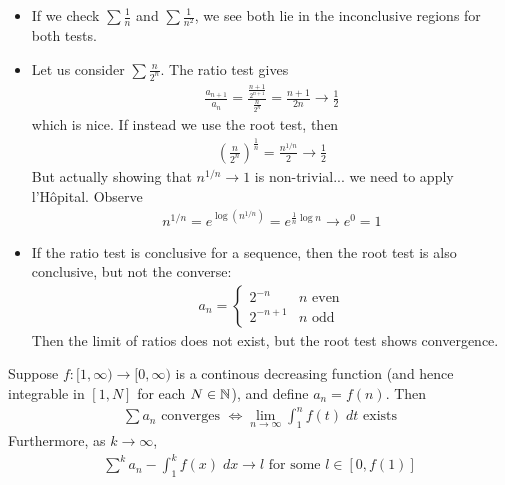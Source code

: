 \documentclass{../template/note}
\begin{document}
    \begin{example}
        \begin{itemize}
            \item If we check \(\sum \frac 1 n\) and \(\sum \frac 1 {n^2}\), we see both lie in the inconclusive regions for both tests.
            \item Let us consider \(\sum \frac{n}{2^n}\). The ratio test gives
            \begin{align*}
                \frac{a_{n+1}}{a_n} = \frac{\frac{n+1}{2^{n+1}}}{\frac{n}{2^n}} = \frac{n+1}{2n} \to \frac 1 2
            \end{align*}
            which is nice. If instead we use the root test, then
            \begin{align*}
                \left(\frac n {2^n}\right)^{\frac 1 n} = \frac{n^{1/n}}{2} \to \frac 1 2
            \end{align*}
            But actually showing that \(n^{1/n} \to 1\) is non-trivial... we need to apply l'H\^opital. Observe
            \begin{align*}
                n^{1/n} = e^{\log(n^{1/n})} = e^{\frac 1 n \log n} \to e^0 = 1
            \end{align*}
            
            
            \item If the ratio test is conclusive for a sequence, then the root test is also conclusive, but not the converse:
            \begin{align*}
                a_n = \begin{cases}
                    2^{-n} & n \text{ even} \\
                    2^{-n+1} & n \text{ odd}
                \end{cases}
            \end{align*}
            Then the limit of ratios does not exist, but the root test shows convergence.            
        \end{itemize}
    \end{example}
    

    \begin{proposition}
        Suppose \(f: [1, \infty) \to [0, \infty)\) is a continous decreasing function (and hence integrable in \([1, N]\) for each \(N \in \mathbb N\)), and define \(a_n = f(n)\). Then
        \begin{align*}
            \sum a_n \text{ converges } \iff \lim_{n \to \infty} \int_1^n f(t) \; dt \text{ exists}
        \end{align*}
        Furthermore, as \(k \to \infty\),
        \begin{align*}
            \sum^k a_n - \int_1^k f(x) \; dx \to l \text{ for some }l \in [0, f(1)]
        \end{align*}        
    \end{proposition}
\end{document}
